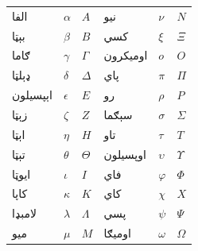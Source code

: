 \documentclass[../../../include/open-logic-chapter]{subfiles}
\begin{document}

\begin{center}
    \begin{tabular}{lll@{\qquad}lll}
    الفا &	$\alpha$ & $A$ &
    نيو & $\nu$ & $N$ \\
    بېټا & $\beta$ & $B$ &
    کسي & $\xi$ & $\Xi$ \\
    ګاما &	$\gamma$ & $\Gamma$ &
    اوميکرون & $o$ & $O$ \\
    ډېلټا & $\delta$ & $\Delta$ &
    پاي & $\pi$ & $\Pi$ \\
    اېپسيلون & $\epsilon$ & $E$ &
    رو & $\rho$ & $P$ \\
    زېټا & $\zeta$ & $Z$ &
    سېګما &	$\sigma$ & $\Sigma$ \\
    اېټا & $\eta$ & $H$ &
    تاو & $\tau$ & $T$ \\
    تېټا & $\theta$ & $\Theta$ &
    اوپسيلون & $\upsilon$ & $\Upsilon$ \\
    ايوټا & $\iota$ & $I$ &
    فاي & $\varphi$ & $\Phi$ \\
    کاپا & $\kappa$ & $K$ &
    کاي & $\chi$ & $X$ \\
    لامبډا & $\lambda$ & $\Lambda$ &
    پسي & $\psi$ & $\Psi$ \\
    ميو & $\mu$ & $M$ &
    اوميګا & $\omega$ & $\Omega$
    \end{tabular}
\end{center}
\end{document}
